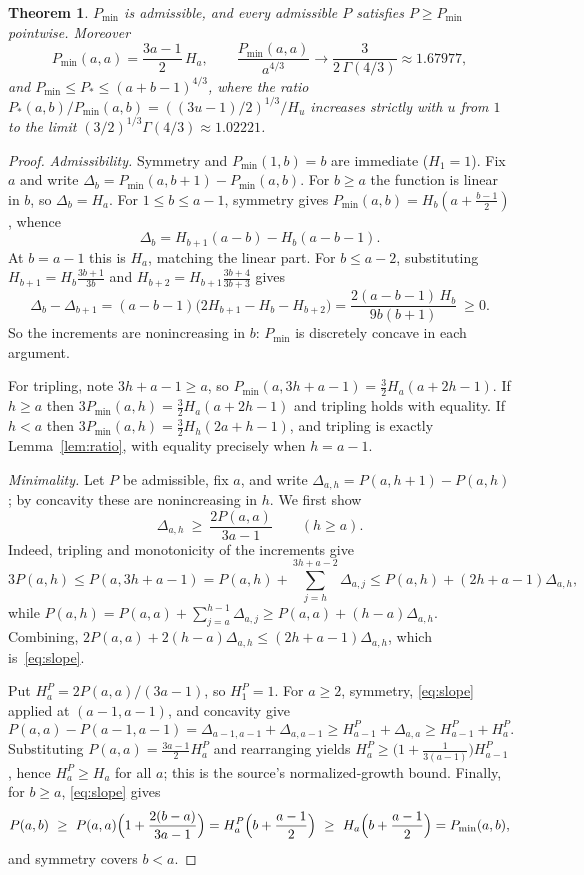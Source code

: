 \documentclass[11pt]{article}
\newtheorem{theorem}{Theorem}
\begin{document}
\begin{theorem}\label{thm:least}
$P_{\min}$ is admissible, and every admissible $P$ satisfies
$P\ge P_{\min}$ pointwise. Moreover
\[
 P_{\min}(a,a)=\frac{3a-1}{2}\,H_a,\qquad
 \frac{P_{\min}(a,a)}{a^{4/3}}\longrightarrow\frac{3}{2\,\Gamma(4/3)}
 \approx1.67977,
\]
and $P_{\min}\le P_*\le(a+b-1)^{4/3}$, where the ratio
$P_*(a,b)/P_{\min}(a,b)=((3u-1)/2)^{1/3}/H_u$ increases strictly with
$u$ from $1$ to the limit $(3/2)^{1/3}\Gamma(4/3)\approx1.02221$.
\end{theorem}

\begin{proof}
\emph{Admissibility.} Symmetry and $P_{\min}(1,b)=b$ are immediate
($H_1=1$). Fix $a$ and write $\Delta_b=P_{\min}(a,b+1)-P_{\min}(a,b)$.
For $b\ge a$ the function is linear in $b$, so $\Delta_b=H_a$. For
$1\le b\le a-1$, symmetry gives $P_{\min}(a,b)=H_b(a+\frac{b-1}2)$, whence
\[
 \Delta_b=H_{b+1}(a-b)-H_b(a-b-1).
\]
At $b=a-1$ this is $H_a$, matching the linear part. For $b\le a-2$,
substituting $H_{b+1}=H_b\frac{3b+1}{3b}$ and
$H_{b+2}=H_{b+1}\frac{3b+4}{3b+3}$ gives
\[
 \Delta_b-\Delta_{b+1}=(a-b-1)\bigl(2H_{b+1}-H_b-H_{b+2}\bigr)
 =\frac{2(a-b-1)\,H_b}{9b(b+1)}\ \ge0 .
\]
So the increments are nonincreasing in $b$: $P_{\min}$ is discretely
concave in each argument.

For tripling, note $3h+a-1\ge a$, so
$P_{\min}(a,3h+a-1)=\tfrac32H_a(a+2h-1)$. If $h\ge a$ then
$3P_{\min}(a,h)=\tfrac32H_a(a+2h-1)$ and tripling holds with equality.
If $h<a$ then $3P_{\min}(a,h)=\tfrac32H_h(2a+h-1)$, and tripling is
exactly Lemma~\ref{lem:ratio}, with equality precisely when $h=a-1$.

\emph{Minimality.} Let $P$ be admissible, fix $a$, and write
$\Delta_{a,h}=P(a,h+1)-P(a,h)$; by concavity these are nonincreasing in
$h$. We first show
\begin{equation}\label{eq:slope}
 \Delta_{a,h}\ \ge\ \frac{2P(a,a)}{3a-1}\qquad(h\ge a).
\end{equation}
Indeed, tripling and monotonicity of the increments give
\[
 3P(a,h)\le P(a,3h+a-1)=P(a,h)+\sum_{j=h}^{3h+a-2}\Delta_{a,j}
 \le P(a,h)+(2h+a-1)\Delta_{a,h},
\]
while $P(a,h)=P(a,a)+\sum_{j=a}^{h-1}\Delta_{a,j}\ge P(a,a)+(h-a)\Delta_{a,h}$.
Combining, $2P(a,a)+2(h-a)\Delta_{a,h}\le(2h+a-1)\Delta_{a,h}$, which
is~\eqref{eq:slope}.

Put $H^P_a=2P(a,a)/(3a-1)$, so $H^P_1=1$. For $a\ge2$, symmetry,
\eqref{eq:slope} applied at $(a-1,a-1)$, and concavity give
\[
 P(a,a)-P(a-1,a-1)=\Delta_{a-1,a-1}+\Delta_{a,a-1}
 \ge H^P_{a-1}+\Delta_{a,a}\ge H^P_{a-1}+H^P_a .
\]
Substituting $P(a,a)=\frac{3a-1}2H^P_a$ and rearranging yields
$H^P_a\ge\bigl(1+\frac1{3(a-1)}\bigr)H^P_{a-1}$, hence $H^P_a\ge H_a$
for all $a$; this is the source's normalized-growth bound. Finally,
for $b\ge a$, \eqref{eq:slope} gives
\[
 P(a,b)\ \ge\ P(a,a)\Bigl(1+\frac{2(b-a)}{3a-1}\Bigr)
 =H^P_a\Bigl(b+\frac{a-1}2\Bigr)\ \ge\ H_a\Bigl(b+\frac{a-1}2\Bigr)
 =P_{\min}(a,b),
\]
and symmetry covers $b<a$.


\end{proof}
\end{document}
